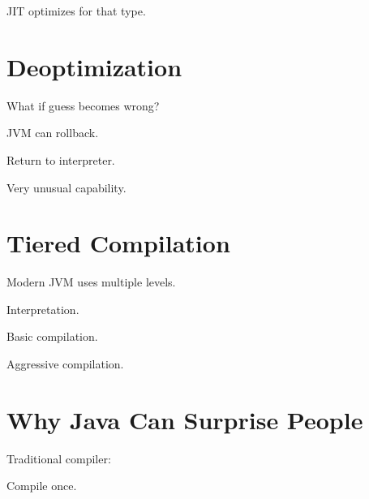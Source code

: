 \documentclass[11pt,a4paper]{book}
\begin{document}
JIT optimizes for that type.


\section{Deoptimization}

What if guess becomes wrong?


JVM can rollback.


Return to interpreter.


Very unusual capability.


\section{Tiered Compilation}

Modern JVM uses multiple levels.


Interpretation.


Basic compilation.


Aggressive compilation.


\section{Why Java Can Surprise People}

Traditional compiler:


Compile once.
\end{document}
